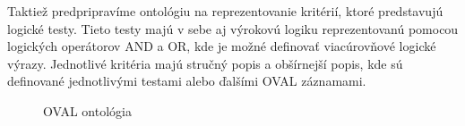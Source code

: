 \documentclass[12pt, a4paper, oneside]{book}
\begin{document}
Taktiež predpripravíme ontológiu na reprezentovanie kritérií, ktoré predstavujú logické testy. Tieto testy majú v sebe aj výrokovú logiku reprezentovanú pomocou logických operátorov AND a OR, kde je možné definovať viacúrovňové logické výrazy. Jednotlivé kritéria majú stručný popis a obšírnejší popis, kde sú definované jednotlivými testami alebo ďalšími OVAL záznamami.


\begin{figure}[!hb]
\label{fig:ovalOnto}
\caption{OVAL ontológia}
\end{figure}
\end{document}
